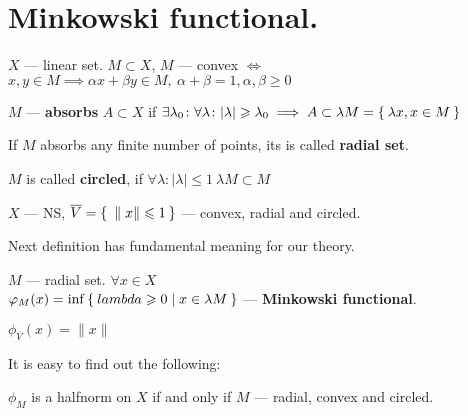 \section{Minkowski functional.}
$X$ --- linear set. $M \subset X$, $M$ --- convex $\iff$ $x,y \in M \implies
\alpha x + \beta y \in M,\ \alpha + \beta = 1, \alpha, \beta \geq 0$ \\
\begin{defn}
  $M$ --- \textbf{absorbs} $A \subset X$ if $\exists \lambda_0 \colon \forall
  \lambda \colon |\lambda| \geqslant \lambda_0 \implies A \subset \lambda M =
  \Set{\lambda x, x \in M}$ \\
\end{defn}

\begin{defn}
  If $M$ absorbs any finite number of points, its is called \textbf{radial set}.
\end{defn}

\begin{defn}
  $M$ is called \textbf{circled}, if $\forall \lambda \colon |\lambda| \leq 1\ \lambda M
  \subset M$
\end{defn}

\begin{ex}
  $X$ --- NS, $\overline{V} = \Set{\|x\| \leqslant1}$ --- convex, radial and circled.
\end{ex}

Next definition has fundamental meaning for our theory.
\begin{defn}
  $M$ --- radial set. $\forall x \in X$ \\
  $\varphi_M(x) = \inf \Set{lambda \geqslant0 | x \in \lambda M}$ ---
  \textbf{Minkowski functional}.
\end{defn}

\begin{ex}
  $\phi_{\overline{V}}(x) = \|x\|$
\end{ex}

It is easy to find out the following:
\begin{stm}
  $\phi_M$ is a halfnorm on $X$ if and only if $M$ --- radial, convex and circled.
\end{stm}